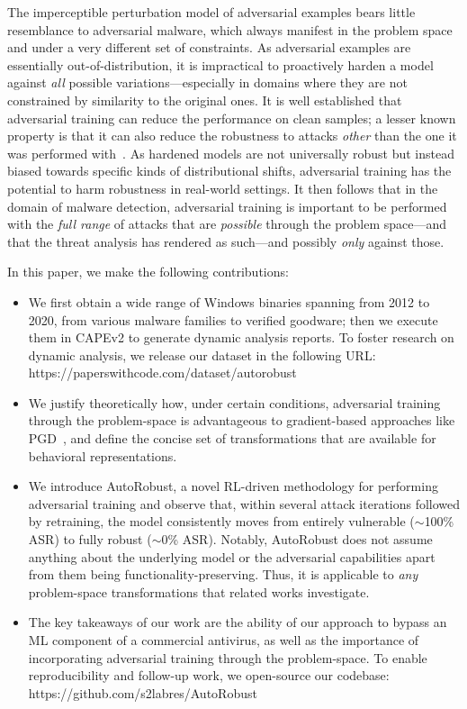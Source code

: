 The imperceptible perturbation model of adversarial examples bears little resemblance to adversarial malware, which always manifest in the problem space and under a very different set of constraints.
As adversarial examples are essentially out-of-distribution, it is impractical to proactively harden a model against \textit{all} possible variations---especially in domains where they are not constrained by similarity to the original ones.
It is well established that adversarial training can reduce the performance on clean samples; a lesser known property is that it can also reduce the robustness to attacks \textit{other} than the one it was performed with~\cite{gilmer2019a}.
As hardened models are not universally robust but instead biased towards specific kinds of distributional shifts, adversarial training has the potential to harm robustness in real-world settings.
It then follows that in the domain of malware detection, adversarial training is important to be performed with the \textit{full range} of attacks that are \textit{possible} through the problem space---and that the threat analysis has rendered as such---and possibly \textit{only} against those.

In this paper, we make the following contributions:
\begin{itemize}
    \item We first obtain a wide range of Windows binaries spanning from 2012 to 2020, from various malware families to verified goodware; then we execute them in CAPEv2 to generate dynamic analysis reports. To foster research on dynamic analysis, we release our dataset in the following URL: https://paperswithcode.com/dataset/autorobust
    \item We justify theoretically how, under certain conditions, adversarial training through the problem-space is advantageous to gradient-based approaches like PGD~\cite{madry2017towards}, and define the concise set of transformations that are available for behavioral representations.
    \item We introduce AutoRobust, a novel RL-driven methodology for performing adversarial training and observe that, within several attack iterations followed by retraining, the model consistently moves from entirely vulnerable ($\sim$100\% ASR) to fully robust ($\sim$0\% ASR). Notably, AutoRobust does not assume anything about the underlying model or the adversarial capabilities apart from them being functionality-preserving. Thus, it is applicable to \textit{any} problem-space transformations that related works investigate.
    \item The key takeaways of our work are the ability of our approach to bypass an ML component of a commercial antivirus, as well as the importance of incorporating adversarial training through the problem-space. To enable reproducibility and follow-up work, we open-source our codebase: https://github.com/s2labres/AutoRobust
\end{itemize}

